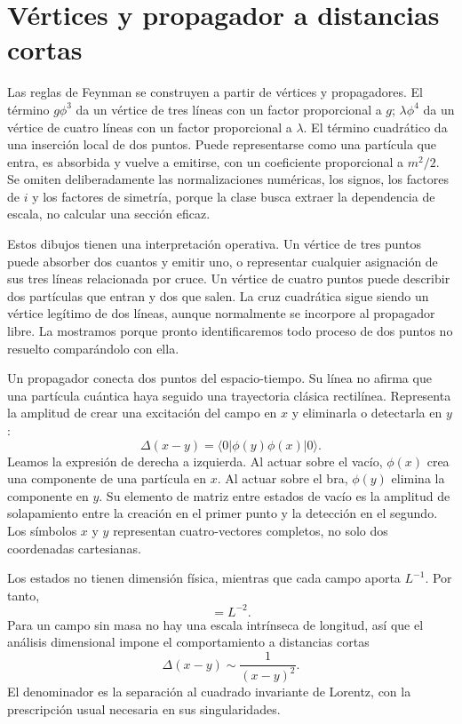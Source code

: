\section{Vértices y propagador a distancias cortas}

Las reglas de Feynman se construyen a partir de vértices y propagadores. El término \(g\phi^3\) da un vértice de tres líneas con un factor proporcional a \(g\); \(\lambda\phi^4\) da un vértice de cuatro líneas con un factor proporcional a \(\lambda\). El término cuadrático da una inserción local de dos puntos. Puede representarse como una partícula que entra, es absorbida y vuelve a emitirse, con un coeficiente proporcional a \(m^2/2\). Se omiten deliberadamente las normalizaciones numéricas, los signos, los factores de \(i\) y los factores de simetría, porque la clase busca extraer la dependencia de escala, no calcular una sección eficaz.

Estos dibujos tienen una interpretación operativa. Un vértice de tres puntos puede absorber dos cuantos y emitir uno, o representar cualquier asignación de sus tres líneas relacionada por cruce. Un vértice de cuatro puntos puede describir dos partículas que entran y dos que salen. La cruz cuadrática sigue siendo un vértice legítimo de dos líneas, aunque normalmente se incorpore al propagador libre. La mostramos porque pronto identificaremos todo proceso de dos puntos no resuelto comparándolo con ella.

Un propagador conecta dos puntos del espacio-tiempo. Su línea no afirma que una partícula cuántica haya seguido una trayectoria clásica rectilínea. Representa la amplitud de crear una excitación del campo en \(x\) y eliminarla o detectarla en \(y\):
\begin{equation}
\Delta(x-y)=\langle0|\phi(y)\phi(x)|0\rangle.
\label{eq:position-propagator}
\end{equation}
Leamos la expresión de derecha a izquierda. Al actuar sobre el vacío, \(\phi(x)\) crea una componente de una partícula en \(x\). Al actuar sobre el bra, \(\phi(y)\) elimina la componente en \(y\). Su elemento de matriz entre estados de vacío es la amplitud de solapamiento entre la creación en el primer punto y la detección en el segundo. Los símbolos \(x\) y \(y\) representan cuatro-vectores completos, no solo dos coordenadas cartesianas.

Los estados no tienen dimensión física, mientras que cada campo aporta \(L^{-1}\). Por tanto,
\begin{equation}
[\Delta]=L^{-2}.
\end{equation}
Para un campo sin masa no hay una escala intrínseca de longitud, así que el análisis dimensional impone el comportamiento a distancias cortas
\begin{equation}
\Delta(x-y)\sim\frac{1}{(x-y)^2}.
\label{eq:massless-propagator}
\end{equation}
El denominador es la separación al cuadrado invariante de Lorentz, con la prescripción usual necesaria en sus singularidades.

